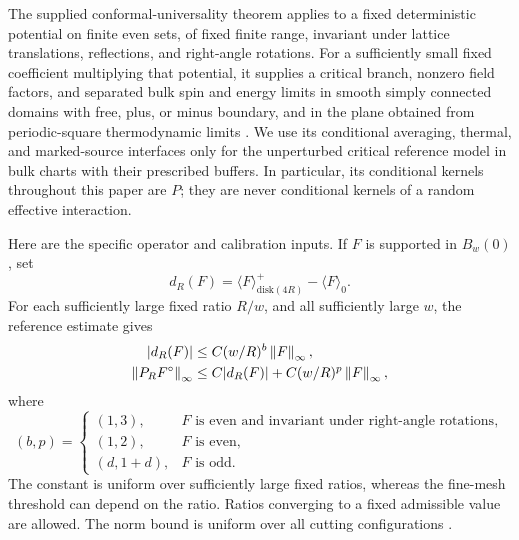 The supplied conformal-universality theorem applies to a fixed deterministic
potential on finite even sets, of fixed finite range, invariant under lattice
translations, reflections, and right-angle rotations.  For a sufficiently
small fixed coefficient multiplying that potential, it supplies a critical
branch, nonzero field factors, and separated bulk spin and energy limits in
smooth simply connected domains with free, plus, or minus boundary, and in
the plane obtained from periodic-square thermodynamic limits
\cite[Theorem~1.1]{ReferenceIsing}.  We use its conditional
averaging, thermal, and marked-source interfaces only for the unperturbed
critical reference model in bulk charts with their prescribed buffers.
In particular, its conditional kernels throughout this paper are $P$;
they are never conditional kernels of a random effective interaction.

Here are the specific operator and calibration inputs.  If $F$ is supported
in $B_w(0)$, set
\begin{equation}\label{ref:disk-response}
 d_R(F)=\langle F\rangle^+_{\mathrm{disk}(4R)}-\langle F\rangle_0.
\end{equation}
For each sufficiently large fixed ratio $R/w$, and all sufficiently large
$w$, the reference estimate gives
\begin{align}
 |d_R(F)|&\le C(w/R)^b\left\lVert F\right\rVert_\infty,
 \label{ref:response-input}\\
 \left\lVert P_RF^\circ\right\rVert_\infty
   &\le C|d_R(F)|+C(w/R)^p\left\lVert F\right\rVert_\infty,
 \label{ref:operator-input}
\end{align}
where
\begin{equation}\label{ref:exponents}
 (b,p)=
 \begin{cases}
  (1,3),&F\text{ is even and invariant under right-angle rotations},\\
  (1,2),&F\text{ is even},\\
  (d,1+d),&F\text{ is odd}.
 \end{cases}
\end{equation}
The constant is uniform over sufficiently large fixed ratios, whereas the
fine-mesh threshold can depend on the ratio.  Ratios converging to a fixed
admissible value are allowed.  The norm bound is uniform over all cutting
configurations \cite[Proposition~4.1]{ReferenceIsing}.

